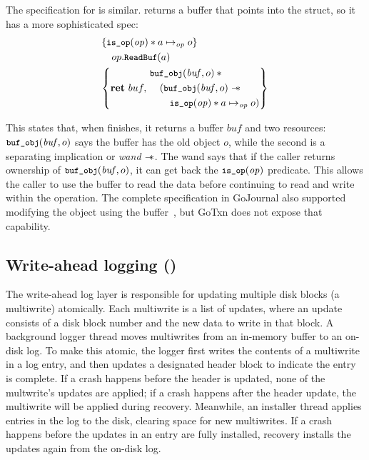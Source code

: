 The specification for  is similar. 
returns a buffer that points into the  struct, so it has a more
sophisticated spec:
%
\begin{align*}
  \hoareV{\cc{is_op}(\mathit{op}) \sep a \mapsto_{\mathit{op}} o}%
        {op.\cc{ReadBuf}(a)}%
        {\Ret{buf}
  \begin{aligned}
  &\cc{buf_obj}(\mathit{buf}, o) \sep \phantom{} \\
  &\quad( \cc{buf_obj}(\mathit{buf}, o) \wand \\
  &\quad\quad \cc{is_op}(\mathit{op}) \sep a \mapsto_{\mathit{op}} o )
    \end{aligned}}
\end{align*}

This states that, when  finishes, it returns a buffer $\mathit{buf}$
and two resources: $\cc{buf_obj}(\mathit{buf}, o)$ says the buffer has the old
object $o$, while the second is a separating implication or \emph{wand} $\mathrel{-\!\!\ast}$.
The wand says that if
the caller returns ownership of $\cc{buf_obj}(\mathit{buf}, o)$, it can get back
the $\cc{is_op}(\mathit{op})$ predicate. This allows the caller to use the
buffer to read the data before continuing to read and write within the
operation. The complete specification in GoJournal also supported modifying the
object using the buffer~\cite{chajed:gojournal}, but GoTxn does not expose that
capability.

\resume

\subsection{Write-ahead logging ()}

The write-ahead log layer is responsible for updating multiple disk
blocks (a multiwrite) atomically.
Each multiwrite is a list
of updates, where an update consists of a disk block number and the new data to write in that block.
A background logger thread moves multiwrites from an in-memory buffer to an
on-disk log. To make this atomic, the logger first writes
the contents of a multiwrite in a log entry, and then updates a designated header block to indicate
the entry is complete. If a crash
happens before the header is updated, none of the multwrite's updates
are applied; if a crash happens after the header update, the multiwrite
will be applied during recovery.
Meanwhile, an installer thread applies entries in the log to the disk, clearing
space for new multiwrites.
If a crash happens before the updates in an entry are fully installed,
recovery installs the updates again from the on-disk log.

